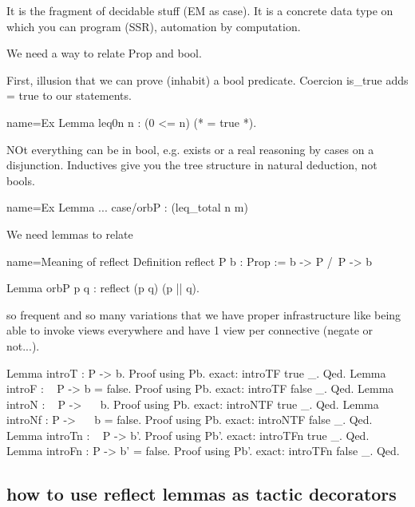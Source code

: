 It is the fragment of decidable stuff (EM as case).
It is a concrete data type on which you can program (SSR), automation by
computation.

% 


We need a way to relate Prop and bool.

First, illusion that we can prove (inhabit) a bool predicate.
Coercion is\_true adds = true to our statements.

\begin{coq}{name=Ex}{}
Lemma leq0n n : (0 <= n) (* = true *).
\end{coq}

NOt everything can be in bool, e.g. exists or a real reasoning by cases
on a disjunction. Inductives give you the tree structure in natural
deduction, not bools.

\begin{coq}{name=Ex}{}
Lemma ...
case/orbP : (leq_total n m)
\end{coq}

We need lemmas to relate

\begin{coq}{name=Meaning of reflect}{}
Definition reflect P b : Prop :=  b -> P /\ P -> b

Lemma orbP p q : reflect (p \/ q) (p || q).
\end{coq}

so frequent and so many variations that we have proper infrastructure like
being able to invoke views everywhere and have 1 view per connective (negate or
not...).

\begin{coq}{}{}
Lemma introT  : P -> b.            Proof using Pb. exact: introTF true _. Qed.
Lemma introF  : ~ P -> b = false.  Proof using Pb. exact: introTF false _. Qed.
Lemma introN  : ~ P -> ~~ b.       Proof using Pb. exact: introNTF true _. Qed.
Lemma introNf : P -> ~~ b = false. Proof using Pb. exact: introNTF false _. Qed.
Lemma introTn : ~ P -> b'.         Proof using Pb'. exact: introTFn true _. Qed.
Lemma introFn : P -> b' = false.   Proof using Pb'. exact: introTFn false _. Qed.
\end{coq}

\subsection{how to use reflect lemmas as tactic decorators}

